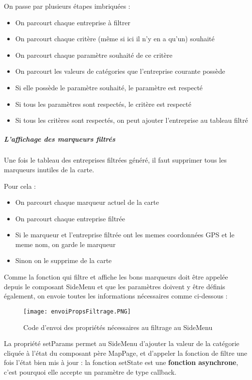 On passe par plusieurs étapes imbriquées :
\begin{itemize}
    \item On parcourt chaque entreprise à filtrer
    \item On parcourt chaque critère (même si ici il n'y en a qu'un) souhaité
    \item On parcourt chaque paramètre souhaité de ce critère
    \item On parcourt les valeurs de catégories que l'entreprise courante possède
    \item Si elle possède le paramètre souhaité, le paramètre est respecté
    \item Si tous les paramètres sont respectés, le critère est respecté
    \item Si tous les critères sont respectés, on peut ajouter l'entreprise au tableau filtré
\end{itemize}

\subparagraph{L'affichage des marqueurs filtrés}
Une fois le tableau des entreprises filtrées généré, il faut supprimer tous les marqueurs inutiles de la carte.

Pour cela : 
\begin{itemize}
    \item On parcourt chaque marqueur actuel de la carte
    \item On parcourt chaque entreprise filtrée
    \item Si le marqueur et l'entreprise filtrée ont les memes coordonnées GPS et le meme nom, on garde le marqueur
    \item Sinon on le supprime de la carte \\
\end{itemize}


Comme la fonction qui filtre et affiche les bons marqueurs doit être appelée depuis le composant SideMenu et que les paramètres doivent y être définis également, on envoie toutes les informations nécessaires comme ci-dessous :

\begin{figure}[H]
    \texttt{[image: envoiPropsFiltrage.PNG]}
    \caption{Code d'envoi des propriétés nécessaires au filtrage au SideMenu}
\end{figure}

La propriété setParams permet au SideMenu d'ajouter la valeur de la catégorie cliquée à l'état du composant père MapPage, et d'appeler la fonction de filtre une fois l'état bien mis à jour : la fonction setState est une \textbf{fonction asynchrone}, c'est pourquoi elle accepte un paramètre de type callback.\\

